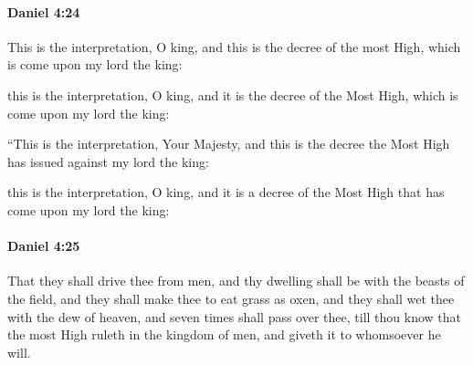 		\paragraph{Daniel 4:24} %
			\label{DANIEL-4-24}

			This is the interpretation, O king, and this is the decree of the most High, which is come upon my lord the king:

			\begin{versebox}
					\item[BHS] 
					\item[LXX] 
					\item[ASV] this is the interpretation, O king, and it is the decree of the Most High, which is come upon my lord the king:
					\item[NIV] “This is the interpretation, Your Majesty, and this is the decree the Most High has issued against my lord the king:
					\item[NRSV] this is the interpretation, O king, and it is a decree of the Most High that has come upon my lord the king:
			\end{versebox}

		\paragraph{Daniel 4:25} %
			\label{DANIEL-4-25}

			That they shall drive thee from men, and thy dwelling shall be with the beasts of the field, and they shall make thee to eat grass as oxen, and they shall wet thee with the dew of heaven, and seven times shall pass over thee, till thou know that the most High ruleth in the kingdom of men, and giveth it to whomsoever he will.

